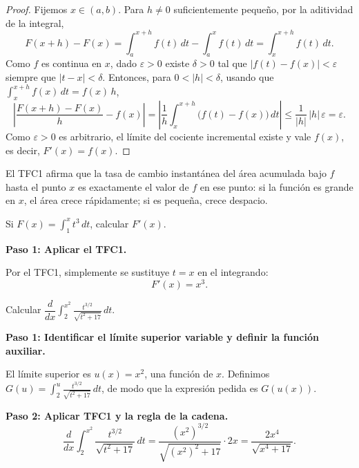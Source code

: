 \begin{proof}
Fijemos $x\in(a,b)$. Para $h\neq 0$ suficientemente pequeño, por la
aditividad de la integral,
\[
  F(x+h)-F(x)=\int_a^{x+h}f(t)\,dt-\int_a^{x}f(t)\,dt=\int_{x}^{x+h}f(t)\,dt.
\]
Como $f$ es continua en $x$, dado $\varepsilon>0$ existe $\delta>0$ tal que
$|f(t)-f(x)|<\varepsilon$ siempre que $|t-x|<\delta$. Entonces, para
$0<|h|<\delta$, usando que $\int_{x}^{x+h}f(x)\,dt=f(x)\,h$,
\[
  \left|\frac{F(x+h)-F(x)}{h}-f(x)\right|
  =\left|\frac{1}{h}\int_{x}^{x+h}\bigl(f(t)-f(x)\bigr)\,dt\right|
  \leq\frac{1}{|h|}\,|h|\,\varepsilon=\varepsilon.
\]
Como $\varepsilon>0$ es arbitrario, el límite del cociente incremental existe
y vale $f(x)$, es decir, $F'(x)=f(x)$.
\end{proof}

El TFC1 afirma que la tasa de cambio instantánea del área acumulada bajo $f$ hasta el punto $x$ es exactamente el valor de $f$ en ese punto: si la función es grande en $x$, el área crece rápidamente; si es pequeña, crece despacio.

\begin{example}
Si $F(x) = \int_{1}^{x} t^3\,dt$, calcular $F'(x)$.

\begin{myproof}

\textbf{Paso 1: Aplicar el TFC1.}

Por el TFC1, simplemente se sustituye $t = x$ en el integrando:
\[
\boxed{F'(x) = x^3.}
\]
\end{myproof}
\end{example}

\begin{example}
Calcular $\dfrac{d}{dx}\displaystyle\int_{2}^{x^2} \frac{t^{3/2}}{\sqrt{t^2+17}}\,dt$.

\begin{myproof}

\textbf{Paso 1: Identificar el límite superior variable y definir la función auxiliar.}

El límite superior es $u(x) = x^2$, una función de $x$. Definimos $G(u) = \int_2^u \frac{t^{3/2}}{\sqrt{t^2+17}}\,dt$, de modo que la expresión pedida es $G(u(x))$.

\textbf{Paso 2: Aplicar TFC1 y la regla de la cadena.}
\[
\boxed{\frac{d}{dx}\int_{2}^{x^2} \frac{t^{3/2}}{\sqrt{t^2+17}}\,dt = \frac{(x^2)^{3/2}}{\sqrt{(x^2)^2+17}}\cdot 2x = \frac{2x^4}{\sqrt{x^4+17}}.}
\]
\end{myproof}
\end{example}

